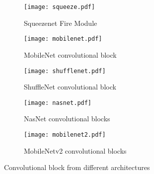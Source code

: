 \begin{figure}[H]
    \centering
    \begin{subfigure}[t]{0.49\linewidth}
        \centering
        \texttt{[image: squeeze.pdf]}
        \caption{Squeezenet Fire Module\cite{iandola_squeezenet_2016}}
        \label{fig:archi_building_block:sqn}
    \end{subfigure}
    \begin{subfigure}[t]{0.49\linewidth}
        \centering
        \texttt{[image: mobilenet.pdf]}
        \caption{MobileNet convolutional block \cite{howard_mobilenets_2017}}
        \label{fig:archi_building_block:mbn}
    \end{subfigure}
    \begin{subfigure}[t]{0.49\linewidth}
        \centering
        \texttt{[image: shufflenet.pdf]}
        \caption{ShuffleNet convolutional block \cite{zhang_shufflenet_2018}}
        \label{fig:archi_building_block:shn}
    \end{subfigure}
    \begin{subfigure}[t]{0.49\linewidth}
        \centering
        \texttt{[image: nasnet.pdf]}
        \caption{NasNet convolutional blocks \cite{zoph_learning_2018}}
        \label{fig:archi_building_block:nasn}
    \end{subfigure}
    \begin{subfigure}[t]{0.49\linewidth}
        \centering
        \texttt{[image: mobilenet2.pdf]}
        \caption{MobileNetv2 convolutional blocks \cite{sandler_mobilenetv2_2018}}
        \label{fig:archi_building_block:mb2n}
    \end{subfigure}
    \caption{Convolutional block from different architectures}
    \label{fig:archi_building_block}
\end{figure}


